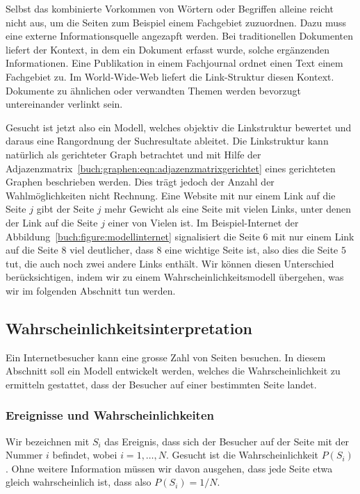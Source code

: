 Selbst das kombinierte Vorkommen von Wörtern oder Begriffen alleine reicht
nicht aus, um die Seiten zum Beispiel einem Fachgebiet zuzuordnen.
Dazu muss eine externe Informationsquelle angezapft werden.
Bei traditionellen Dokumenten liefert der Kontext, in dem ein
Dokument erfasst wurde, solche ergänzenden Informationen.
Eine Publikation in einem Fachjournal ordnet einen Text einem Fachgebiet zu.
Im World-Wide-Web liefert die Link-Struktur diesen Kontext.
%
Dokumente zu ähnlichen oder verwandten Themen werden bevorzugt
untereinander verlinkt sein.

Gesucht ist jetzt also ein Modell, welches objektiv die Linkstruktur
bewertet und daraus eine Rangordnung der Suchresultate ableitet.
Die Linkstruktur kann natürlich als gerichteter Graph betrachtet und 
mit Hilfe der Adjazenzmatrix~\eqref{buch:graphen:eqn:adjazenzmatrixgerichtet}
%
eines gerichteten Graphen beschrieben werden.
Dies trägt jedoch der Anzahl der Wahlmöglichkeiten nicht Rechnung.
Eine Website mit nur einem Link auf die Seite $j$ gibt der Seite $j$
mehr Gewicht als eine Seite mit vielen Links, unter denen der Link
auf die Seite $j$ einer von Vielen ist.
Im Beispiel-Internet der Abbildung~\ref{buch:figure:modellinternet}
signalisiert die Seite $6$ mit nur einem Link auf die Seite $8$
viel deutlicher, dass $8$ eine wichtige Seite ist, also dies die
Seite $5$ tut, die auch noch zwei andere Links enthält.
Wir können diesen Unterschied berücksichtigen, indem wir zu einem
Wahrscheinlichkeitsmodell übergehen, was wir im folgenden Abschnitt
tun werden.

%
%
\subsection{Wahrscheinlichkeitsinterpretation
\label{buch:subsection:wahrscheinlichkeitsinterpretation}}
Ein Internetbesucher kann eine grosse Zahl von Seiten besuchen.
In diesem Abschnitt soll ein Modell entwickelt werden, welches die
Wahrscheinlichkeit zu ermitteln gestattet, dass der Besucher auf
einer bestimmten Seite landet.

\subsubsection{Ereignisse und Wahrscheinlichkeiten}
Wir bezeichnen mit $S_i$ das Ereignis, dass sich der Besucher auf
der Seite mit der Nummer $i$ befindet, wobei $i=1,\dots,N$.
Gesucht ist die Wahrscheinlichkeit $P(S_i)$.
Ohne weitere Information müssen wir davon ausgehen, dass jede Seite
etwa gleich wahrscheinlich ist, dass also $P(S_i) = 1/N$.

